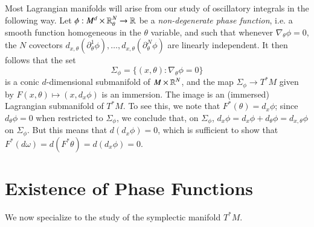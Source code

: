 \begin{example}
    Most Lagrangian manifolds will arise from our study of oscillatory integrals in the following way. Let $\phi: M^d \times \operatorname{\mathbb{R}}^N_\theta \to \operatorname{\mathbb{R}}$ be a \emph{non-degenerate phase function}, i.e. a smooth function homogeneous in the $\theta$ variable, and such that whenever $\nabla_\theta \phi = 0$, the $N$ covectors $d_{x,\theta}(\partial_\theta^1 \phi), \dots, d_{x,\theta}(\partial_\theta^N \phi)$ are linearly independent. It then follows that the set
    \[ \Sigma_\phi = \{ (x,\theta): \nabla_\theta \phi = 0 \} \]
    is a conic $d$-dimensional submanifold of $M \times \operatorname{\mathbb{R}}^N$, and the map $\Sigma_\phi \to T^* M$ given by $F(x,\theta) \mapsto (x, d_x \phi)$ is an immersion. The image is an (immersed) Lagrangian submanifold of $T^* M$. To see this, we note that $F^*(\theta) = d_x\phi$; since $d_\theta \phi = 0$ when restricted to $\Sigma_\phi$, we conclude that, on $\Sigma_\phi$, $d_x \phi = d_x \phi + d_\theta \phi = d_{x,\theta} \phi$ on $\Sigma_\phi$. But this means that $d(d_x \phi) = 0$, which is sufficient to show that $F^*(d \omega) = d(F^* \theta) = d(d_x \phi) = 0$.
\end{example}

\section{Existence of Phase Functions}

We now specialize to the study of the symplectic manifold $T^*M$.

